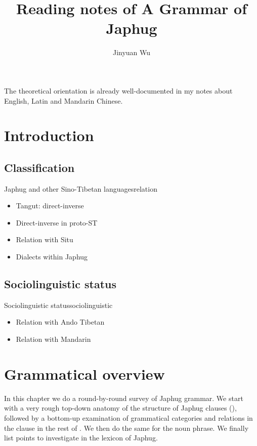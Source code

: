 \documentclass[a4paper, oneside, 12pt]{report}
\title{Reading notes of A Grammar of Japhug}
\author{Jinyuan Wu}
\begin{document}
\maketitle

The theoretical orientation is already well-documented in my notes about English, Latin and Mandarin Chinese.

\chapter{Introduction}

\section{Classification}

\begin{todobox}{Japhug and other Sino-Tibetan languages}{relation}
    \begin{itemize}
        \item Tangut: direct-inverse
        \item Direct-inverse in proto-ST
        \item Relation with Situ
        \item Dialects within Japhug
    \end{itemize}
\end{todobox}

\section{Sociolinguistic status}

\begin{todobox}{Sociolinguistic status}{sociolinguistic}
    \begin{itemize}
        \item Relation with Ando Tibetan
        \item Relation with Mandarin
    \end{itemize}
\end{todobox}

\chapter{Grammatical overview}

In this chapter we do a round-by-round survey of Japhug grammar.
We start with a very rough top-down anatomy of the structure of Japhug clauses
(),
followed by a bottom-up examination of grammatical categories and relations in the clause
in the rest of .
We then do the same for the noun phrase.
We finally list points to investigate in the lexicon of Japhug.
\end{document}
